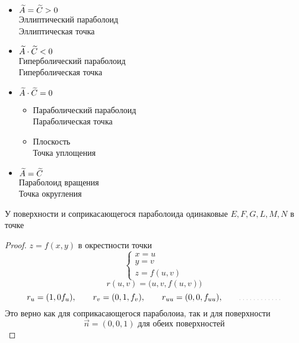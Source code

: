 \begin{definition}[классификация]
	\hfill
	\begin{itemize}
		\item $ \widetilde{A} = \widetilde{C} > 0 $ \\
		Эллиптический параболоид \\
		Эллиптическая точка
		\item $ \widetilde{A} \cdot \widetilde{C} < 0 $ \\
		Гиперболический параболоид \\
		Гиперболическая точка
		\item $ \widetilde{A} \cdot \widetilde{C} = 0 $
		\begin{itemize}
			\item Параболический параболоид \\
			Параболическая точка
			\item Плоскость \\
			Точка уплощения
		\end{itemize}
		\item $ \widetilde{A} = \widetilde{C} $ \\
		Параболоид вращения \\
		Точка округления
	\end{itemize}
\end{definition}

\begin{theorem}
	У поверхности и соприкасающегося параболоида одинаковые $ E, F, G, L, M, N $ в точке
\end{theorem}

\begin{proof}
	$ z = f(x, y) $ в окрестности точки
	$$
	\begin{cases}
		x = u \\
		y = v \\
		z = f(u, v)
	\end{cases} $$
	$$ r(u, v) = \bigg( u, v, f(u, v) \bigg) $$
	$$ r_u = (1, 0 f_u), \qquad r_v = (0, 1, f_v), \qquad r_{uu} = (0, 0, f_{uu}), \qquad \widedots[5em] $$
	Это верно как для соприкасающегося параболоиа, так и для поверхности
	$$ \vec{n} = (0, 0, 1) \text{ для обеих поверхностей} $$
\end{proof}
